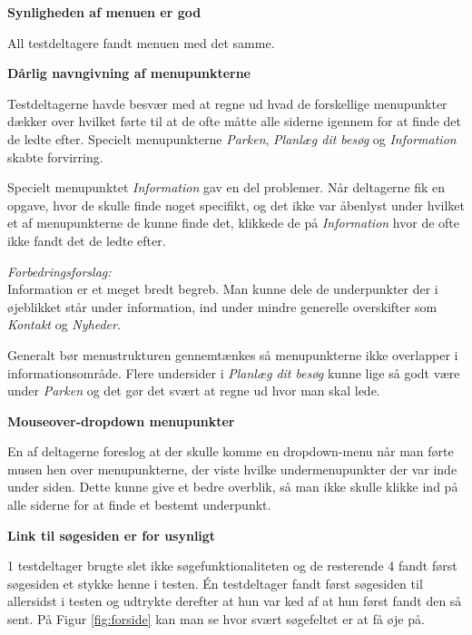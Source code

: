 \documentclass[10pt,a4paper]{article}      %
\newenvironment{forslag}{\emph{Forbedringsforslag:}\\[0.5mm]}{}
\newcommand\pic[1]{\texttt{[image: Pics/\#1]}}
\renewcommand\good{\pic{good}}
\renewcommand\goodidea{\pic{goodidea}}
\renewcommand\seriousproblem{\pic{seriousproblem}}
\begin{document}
\begin{kommentarer}

\item[\good]{\textbf{Synligheden af menuen er god}}

All testdeltagere fandt menuen med det samme.

\item[\seriousproblem]{\textbf{Dårlig navngivning af menupunkterne}}

Testdeltagerne havde besvær med at regne ud hvad de forskellige menupunkter
dækker over hvilket førte til at de ofte måtte alle siderne igennem for at finde
det de ledte efter. Specielt menupunkterne \emph{Parken}, \emph{Planlæg dit
besøg} og \emph{Information} skabte forvirring.

Specielt menupunktet \emph{Information} gav en del problemer. Når deltagerne fik en opgave,
hvor de skulle finde noget specifikt, og det ikke var åbenlyst under hvilket et af
menupunkterne de kunne finde det, klikkede de på \emph{Information} hvor de ofte ikke fandt
det de ledte efter.

\begin{forslag}
    Information er et meget bredt begreb. Man kunne dele de underpunkter der i øjeblikket
står under information, ind under mindre generelle overskifter som \emph{Kontakt} og
\emph{Nyheder}.

    Generalt bør menustrukturen gennemtænkes så menupunkterne ikke overlapper i
informationsområde. Flere undersider i \emph{Planlæg dit besøg} kunne lige så godt være under
\emph{Parken} og det gør det svært at regne ud hvor man skal lede.
\end{forslag}

\item[\goodidea] \textbf{Mouseover-dropdown menupunkter}

En af deltagerne foreslog at der skulle komme en dropdown-menu når man førte
musen hen over menupunkterne, der viste hvilke undermenupunkter der var inde
under siden. Dette kunne give et bedre overblik, så man ikke skulle klikke ind
på alle siderne for at finde et bestemt underpunkt.

\item[\seriousproblem]{\textbf{Link til søgesiden er for usynligt}}

1 testdeltager brugte slet ikke søgefunktionaliteten og de resterende 4 fandt
først søgesiden et stykke henne i testen. Én testdeltager fandt først søgesiden
til allersidst i testen og udtrykte derefter at hun var ked af at hun først
fandt den så sent. På Figur \ref{fig:forside} kan man se hvor svært søgefeltet
er at få øje på.


\end{kommentarer}
\end{document}
